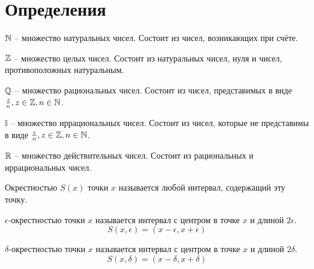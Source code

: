 \section{Определения}


\begin{definition}
    $\mathbb{N}$ -- множество натуральных чисел.
    Состоит из чисел, возникающих при счёте. 
\end{definition}


\begin{definition}
    $\mathbb{Z}$ -- множество целых чисел.
    Состоит из натуральных чисел, нуля и чисел, противоположных натуральным.
\end{definition}


\begin{definition}
    $\mathbb{Q}$ -- множество рациональных чисел. 
    Состоит из чисел, представимых в виде $\frac{z}{n}, z \in \mathbb{Z}, n \in \mathbb{N}$.
\end{definition}


\begin{definition}
    $\mathbb{I}$ -- множество иррациональных чисел.
    Состоит из чисел, которые не представимы в виде $\frac{z}{n}, z \in \mathbb{Z}, n \in \mathbb{N}$. 
\end{definition}


\begin{definition}
    $\mathbb{R}$ -- множество действительных чисел.
    Состоит из рациональных и иррациональных чисел.
\end{definition}


\begin{definition}
    Окрестностью $S(x)$ точки $x$ называется любой интервал, содержащий эту точку. 
\end{definition}


\begin{definition}
    $\epsilon$-окрестностью точки $x$ называется интервал с центром в точке $x$ и длиной $2 \epsilon$. \[
        S(x, \epsilon) = (x-\epsilon, x+\epsilon)
    \]
\end{definition}


\begin{definition}
    $\delta$-окрестностью точки $x$ называется интервал с центром в точке $x$ и длиной $2 \delta$.  \[
        S(x, \delta) = (x-\delta, x+\delta)
    \]
\end{definition}


